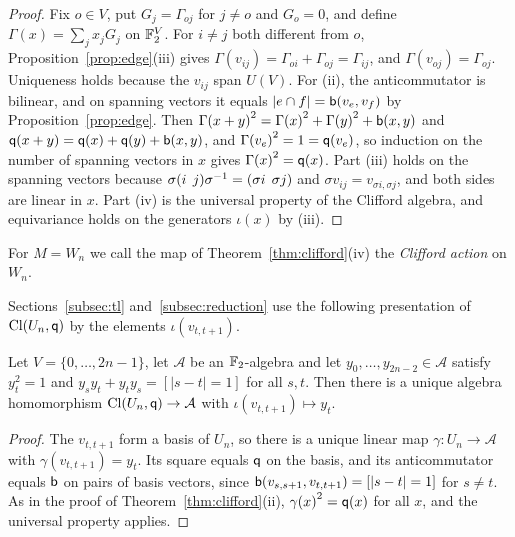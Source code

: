\begin{proof}
Fix $o\in V$, put $G_j=\Gamma_{oj}$ for $j\ne o$ and $G_o=0$, and define $\Gamma(x)=\sum_j x_{j}G_j$ on $\mathbb{F}_2^V$. For $i\ne j$ both different from $o$, Proposition~\ref{prop:edge}(iii) gives $\Gamma(v_{ij})=\Gamma_{oi}+\Gamma_{oj}=\Gamma_{ij}$, and $\Gamma(v_{oj})=\Gamma_{oj}$. Uniqueness holds because the $v_{ij}$ span $U(V)$. For (ii), the anticommutator is bilinear, and on spanning vectors it equals $|e\cap f|=\mathsf{b}(v_e,v_f)$ by Proposition~\ref{prop:edge}. Then ${\Gamma(x+y)}^2={\Gamma(x)}^2+{\Gamma(y)}^2+\mathsf{b}(x,y)$ and $\mathsf{q}(x+y)=\mathsf{q}(x)+\mathsf{q}(y)+\mathsf{b}(x,y)$, and ${\Gamma(v_e)}^2=1=\mathsf{q}(v_e)$, so induction on the number of spanning vectors in $x$ gives ${\Gamma(x)}^2=\mathsf{q}(x)$. Part (iii) holds on the spanning vectors because $\sigma(i\;\,j)\sigma^{-1}=(\sigma i\;\,\sigma j)$ and $\sigma v_{ij}=v_{\sigma i,\sigma j}$, and both sides are linear in $x$. Part (iv) is the universal property of the Clifford algebra, and equivariance holds on the generators $\iota(x)$ by (iii).
\end{proof}

For $M=W_n$ we call the map of Theorem~\ref{thm:clifford}(iv) the \emph{Clifford action} on $W_n$.

Sections~\ref{subsec:tl} and~\ref{subsec:reduction} use the following presentation of $\operatorname{Cl}(U_n,\mathsf{q})$ by the elements $\iota(v_{t,t+1})$.

\begin{lemma}\label{lem:reducehom}
Let $V=\{0,\dots,2n-1\}$, let $\mathcal A$ be an $\mathbb{F}_2$-algebra and let $y_0,\dots,y_{2n-2}\in\mathcal A$ satisfy $y_t^2=1$ and $y_{s}y_t+y_{t}y_s=[|s-t|=1]$ for all $s,t$. Then there is a unique algebra homomorphism $\operatorname{Cl}(U_n,\mathsf{q})\to\mathcal A$ with $\iota(v_{t,t+1})\mapsto y_t$.
\end{lemma}

\begin{proof}
The $v_{t,t+1}$ form a basis of $U_n$, so there is a unique linear map $\gamma\colon U_n\to\mathcal A$ with $\gamma(v_{t,t+1})=y_t$. Its square equals $\mathsf{q}$ on the basis, and its anticommutator equals $\mathsf{b}$ on pairs of basis vectors, since $\mathsf{b}(v_{s,s+1},v_{t,t+1})=[|s-t|=1]$ for $s\ne t$. As in the proof of Theorem~\ref{thm:clifford}(ii), ${\gamma(x)}^2=\mathsf{q}(x)$ for all $x$, and the universal property applies.
\end{proof}
